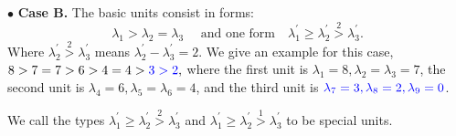 \documentclass[draft]{amsart}
\numberwithin{equation}{section}
\theoremstyle{plain}
\theoremstyle{remark}
\begin{document}
$\bullet$ \textbf{ Case B.} \label{Case B}The basic units consist in forms:
$$
\lambda_{1} >\lambda_{2}=\lambda_{3} \quad \mbox{ and one form}\quad \lambda_{1}^{\prime}\geq \lambda_{2}^{\prime}\overset{2}{>}\lambda_{3}^{\prime}.
$$
Where $\lambda_{2}^{\prime}\overset{2}{>}\lambda_{3}^{\prime}$ means $\lambda_{2}^{\prime}-\lambda_{3}^{\prime}=2$. We give an example for this case,
$
8>7=7>6>4=4>{\color{blue}3>2},
$
where the first unit is $\lambda_{1}=8, \lambda_{2}=\lambda_{3}=7$,  the second unit is $\lambda_{4}=6, \lambda_{5}=\lambda_{6}=4$, and the third unit is ${\color{blue}\lambda_{7}=3,\lambda_{8}=2, \lambda_{9}=0}$.



We call the types $\lambda_{1}^{\prime}\geq \lambda_{2}^{\prime}\overset{2}{>}\lambda_{3}^{\prime}$ and $\lambda_{1}^{\prime}\geq \lambda_{2}^{\prime}\overset{1}{>}\lambda_{3}^{\prime}$ to be special units.
\end{document}
